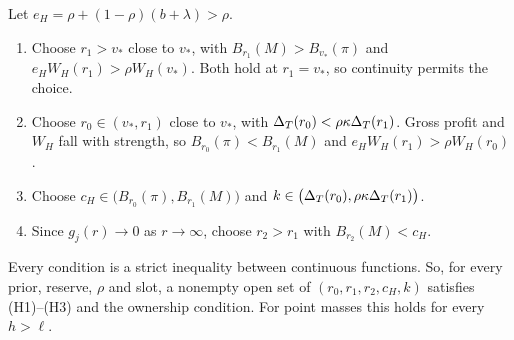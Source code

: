 \begin{resultbox}
Let \(e_H=\rho+(1-\rho)(b+\lambda)>\rho\).
\begin{enumerate}[leftmargin=2em]
\item Choose \(r_1>v_*\) close to \(v_*\), with \(B_{r_1}(M)>B_{v_*}(\pi)\) and \(e_HW_H(r_1)>\rho W_H(v_*)\). Both
hold at \(r_1=v_*\), so continuity permits the choice.
\item Choose \(r_0\in(v_*,r_1)\) close to \(v_*\), with \(\Delta_T(r_0)<\rho\kappa\Delta_T(r_1)\). Gross profit and \(W_H\) fall
with strength, so \(B_{r_0}(\pi)<B_{r_1}(M)\) and \(e_HW_H(r_1)>\rho W_H(r_0)\).
\item Choose \(c_H\in\bigl(B_{r_0}(\pi),B_{r_1}(M)\bigr)\) and \(k\in\bigl(\Delta_T(r_0),\rho\kappa\Delta_T(r_1)\bigr)\).
\item Since \(g_j(r)\to0\) as \(r\to\infty\), choose \(r_2>r_1\) with \(B_{r_2}(M)<c_H\).
\end{enumerate}
Every condition is a strict inequality between continuous functions. So, for every prior, reserve, \(\rho\) and slot,
a nonempty open set of \((r_0,r_1,r_2,c_H,k)\) satisfies (H1)--(H3) and the ownership condition. For point masses this
holds for every \(h>\ell\).
\end{resultbox}

